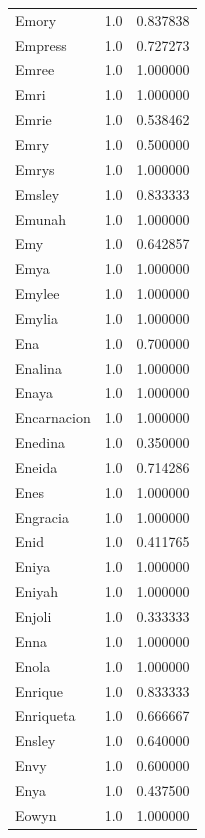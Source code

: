 \documentclass[
  letterpaper,
  DIV=11,
  numbers=noendperiod]{scrreprt}
\begin{document}
\begin{tabular}{lrr}
Emory           &   1.0 &   0.837838 \\
Empress         &   1.0 &   0.727273 \\
Emree           &   1.0 &   1.000000 \\
Emri            &   1.0 &   1.000000 \\
Emrie           &   1.0 &   0.538462 \\
Emry            &   1.0 &   0.500000 \\
Emrys           &   1.0 &   1.000000 \\
Emsley          &   1.0 &   0.833333 \\
Emunah          &   1.0 &   1.000000 \\
Emy             &   1.0 &   0.642857 \\
Emya            &   1.0 &   1.000000 \\
Emylee          &   1.0 &   1.000000 \\
Emylia          &   1.0 &   1.000000 \\
Ena             &   1.0 &   0.700000 \\
Enalina         &   1.0 &   1.000000 \\
Enaya           &   1.0 &   1.000000 \\
Encarnacion     &   1.0 &   1.000000 \\
Enedina         &   1.0 &   0.350000 \\
Eneida          &   1.0 &   0.714286 \\
Enes            &   1.0 &   1.000000 \\
Engracia        &   1.0 &   1.000000 \\
Enid            &   1.0 &   0.411765 \\
Eniya           &   1.0 &   1.000000 \\
Eniyah          &   1.0 &   1.000000 \\
Enjoli          &   1.0 &   0.333333 \\
Enna            &   1.0 &   1.000000 \\
Enola           &   1.0 &   1.000000 \\
Enrique         &   1.0 &   0.833333 \\
Enriqueta       &   1.0 &   0.666667 \\
Ensley          &   1.0 &   0.640000 \\
Envy            &   1.0 &   0.600000 \\
Enya            &   1.0 &   0.437500 \\
Eowyn           &   1.0 &   1.000000 \\

\end{tabular}
\end{document}
